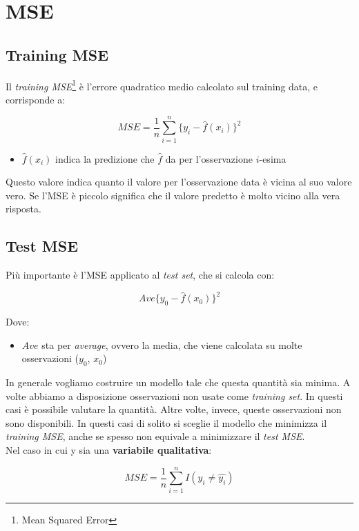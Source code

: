 \section{MSE}

\subsection{Training MSE}
Il \textit{training MSE}\footnote{Mean Squared Error} \`e l'errore quadratico 
medio calcolato sul training data, e corrisponde a:

\[ MSE = \frac{1}{n} \sum_{i=1}^n \{y_i - \hat{f}(x_i)\}^2 \]

\begin{itemize}
 \item $\hat{f}(x_i)$ indica la predizione che $\hat{f}$ da per l'osservazione 
$i$-esima
\end{itemize}


Questo valore indica quanto il valore per l'osservazione data \`e vicina al suo 
valore vero. Se l'MSE \`e piccolo significa che il valore predetto \`e molto 
vicino alla vera risposta.

\subsection{Test MSE}

Pi\`u importante \`e l'MSE applicato al \textit{test set}, che si calcola con:

\[ Ave\{y_0 - \hat{f}(x_0)\}^2 \]

Dove:
\begin{itemize}
 \item $Ave$ sta per \textit{average}, ovvero la media, che viene calcolata su 
molte osservazioni ($y_0$, $x_0$)
\end{itemize}

In generale vogliamo costruire un modello tale che questa quantit\`a sia minima.
A volte abbiamo a disposizione osservazioni non usate come \textit{training set}.
In questi casi \`e possibile valutare la quantit\`a. Altre volte, invece, queste
osservazioni non sono disponibili. In questi casi di solito si sceglie il modello
che minimizza il \textit{training MSE}, anche se spesso non equivale a minimizzare
il \textit{test MSE}.\\

Nel caso in cui y sia una \textbf{variabile qualitativa}:

\[ MSE = \frac{1}{n} \sum_{i=1}^n I(y_i \neq \hat{y_i}) \]
